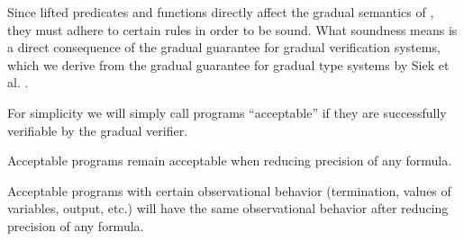 Since lifted predicates and functions directly affect the gradual semantics of \gvl, they must adhere to certain rules in order to be sound.
What soundness means is a direct consequence of the gradual guarantee for gradual verification systems, which we derive from the gradual guarantee for gradual type systems by Siek et al. \cite{siek2015refined}.

For simplicity we will simply call programs “acceptable” if they are successfully verifiable by the gradual verifier.

\begin{definition}
    \label{grad-guarantee-static}
    Acceptable programs remain acceptable when reducing precision of any formula.
\end{definition}

\begin{definition}
    \label{grad-guarantee-dynamic}
    Acceptable programs with certain observational behavior (termination, values of variables, output, etc.) will have the same observational behavior after reducing precision of any formula.
\end{definition}

\begin{comment}
With the notion of precision, we can give a formal definition of the gradual guarantee (TODO: ref) that we are aiming to satisfy.




PROBABLY UNNECESSARY:\\
Because of its generality, we will pursue the approach introduced in section \ref{ssec:wildcard-with-upper} for the remainder of this chapter.
As concretization we chose the semantic version, as it is more flexible than the syntactic one in practice.
For reference, the full definitions:
\begin{align*} 
&\text{Syntax:}\\
&\grad{\phi} ::= \phi ~|~ \withqmGen{\phi}\\
\\
&\text{Concretization:}\\
&\gamma(\phi) = \{~ \phi ~\}     \quad\quad \forall \phi \in \setFormulaA\\
&\gamma(\withqmGen{\phi}) = \{~ \phi' \in \setFormulaA ~|~ \phiImplies{\phi'}{\phi} ~\}\\
&\gamma(\grad{\phi}) = \emptyset    \quad\textit{otherwise}
\end{align*}
\end{comment}
